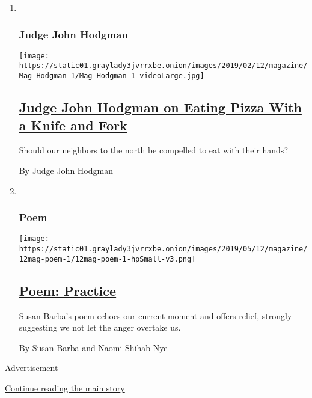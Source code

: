\begin{enumerate}
\def\labelenumi{\arabic{enumi}.}
\item ~
  \hypertarget{judge-john-hodgman}{%
  \subsubsection{Judge John Hodgman}\label{judge-john-hodgman}}

  \texttt{[image: https://static01.graylady3jvrrxbe.onion/images/2019/02/12/magazine/Mag-Hodgman-1/Mag-Hodgman-1-videoLarge.jpg]}

  \hypertarget{judge-john-hodgman-on-eating-pizza-with-a-knife-and-fork}{%
  \subsection{\texorpdfstring{\href{/2020/01/09/magazine/judge-john-hodgman-on-eating-pizza-with-a-knife-and-fork.html}{Judge
  John Hodgman on Eating Pizza With a Knife and
  Fork}}{Judge John Hodgman on Eating Pizza With a Knife and Fork}}\label{judge-john-hodgman-on-eating-pizza-with-a-knife-and-fork}}

  Should our neighbors to the north be compelled to eat with their
  hands?

  By Judge John Hodgman
\item ~
  \hypertarget{poem}{%
  \subsubsection{Poem}\label{poem}}

  \texttt{[image: https://static01.graylady3jvrrxbe.onion/images/2019/05/12/magazine/12mag-poem-1/12mag-poem-1-hpSmall-v3.png]}

  \hypertarget{poem-practice}{%
  \subsection{\texorpdfstring{\href{/2020/01/09/magazine/poem-practice.html}{Poem:
  Practice}}{Poem: Practice}}\label{poem-practice}}

  Susan Barba's poem echoes our current moment and offers relief,
  strongly suggesting we not let the anger overtake us.

  By Susan Barba and Naomi Shihab Nye
\end{enumerate}

Advertisement

\protect\hyperlink{after-mid1}{Continue reading the main story}

